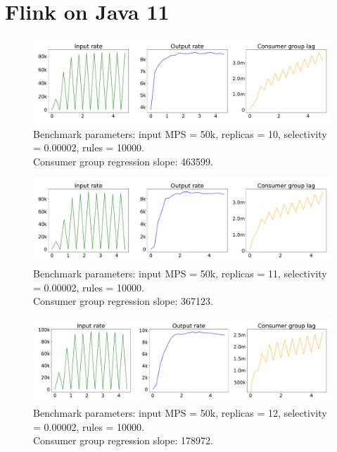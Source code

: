 \newpage

\section{Flink on Java 11}\label{sec:flink-on-java-11}

\begin{figure}[H]
    \centering
    \includegraphics[width=1\textwidth]{figures/flink-java-11-replicas-10}
    \caption{Benchmark parameters: input MPS = 50k, replicas = 10, selectivity = 0.00002, rules = 10000. \\
    Consumer group regression slope: 463599.}
    \label{fig:flink-java-11-new-gc-replicas-10}
\end{figure}


\begin{figure}[H]
    \centering
    \includegraphics[width=1\textwidth]{figures/flink-java-11-replicas-11}
    \caption{Benchmark parameters: input MPS = 50k, replicas = 11, selectivity = 0.00002, rules = 10000. \\
    Consumer group regression slope: 367123.}
    \label{fig:flink-java-11-replicas-11}
\end{figure}

\begin{figure}[H]
    \centering
    \includegraphics[width=1\textwidth]{figures/flink-java-11-replicas-12}
    \caption{Benchmark parameters: input MPS = 50k, replicas = 12, selectivity = 0.00002, rules = 10000. \\
    Consumer group regression slope: 178972.}
    \label{fig:flink-java-11-replicas-12}
\end{figure}


